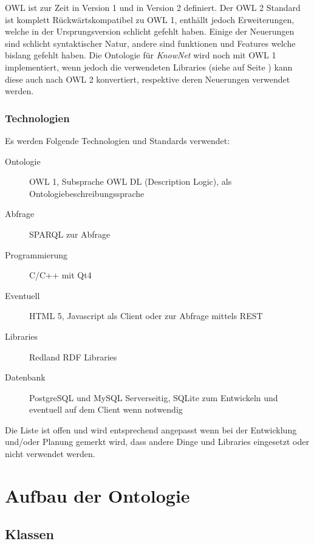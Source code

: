 \documentclass[
    11pt,
    latin1,
    a4paper,
    oneside
]{scrreprt}
\begin{document}
OWL ist zur Zeit in Version 1 und in Version 2 definiert. Der OWL 2 Standard\cite{W3COWL2} ist komplett R\"uckw\"artskompatibel zu OWL 1, enth\"allt jedoch Erweiterungen, welche in der Ursprungsversion schlicht gefehlt haben. Einige der Neuerungen sind schlicht syntaktischer Natur, andere sind funktionen und Features welche bislang gefehlt haben. Die Ontologie f\"ur \emph{KnowNet} wird noch mit OWL 1 implementiert, wenn jedoch die verwendeten Libraries (siehe  auf Seite \pageref{sec:technologies}) kann diese auch nach OWL 2 konvertiert, respektive deren Neuerungen verwendet werden.

\subsection{Technologien} \label{sec:technologies}

Es werden Folgende Technologien und Standards verwendet:

\begin{description}
  \item[Ontologie] OWL 1, Subsprache OWL DL (Description Logic), als Ontologiebeschreibungssprache
  \item[Abfrage] SPARQL\cite{SPARQL} zur Abfrage
  \item[Programmierung] C/C++ mit Qt4\cite{QT}
  \item[Eventuell] HTML 5, Javascript als Client oder zur Abfrage mittels REST
  \item[Libraries] Redland RDF Libraries\cite{LIBRDF}
  \item[Datenbank] PostgreSQL und MySQL Serverseitig, SQLite zum Entwickeln und eventuell auf dem Client wenn notwendig
\end{description}

Die Liste ist offen und wird entsprechend angepasst wenn bei der Entwicklung und/oder Planung gemerkt wird, dass andere Dinge und Libraries eingesetzt oder nicht verwendet werden.

\chapter{Aufbau der Ontologie} \label{sec:ontology}


\section{Klassen} \label{sec:class}
\end{document}
